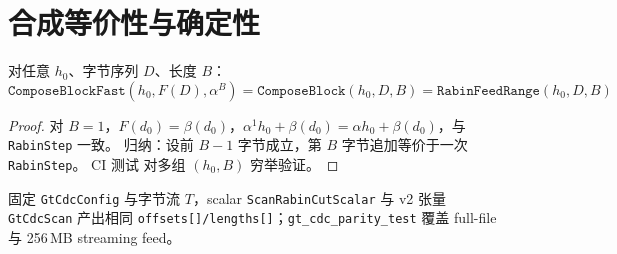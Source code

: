\chapter{合成等价性与确定性}
\label{ch:compose}

\begin{theorem}
对任意 $h_0$、字节序列 $D$、长度 $B$：
\begin{equation}
  \texttt{ComposeBlockFast}(h_0, F(D), \alpha^B)
  = \texttt{ComposeBlock}(h_0, D, B)
  = \texttt{RabinFeedRange}(h_0, D, B)
\end{equation}
\end{theorem}

\begin{proof}
对 $B=1$，$F(d_0)=\beta(d_0)$，$\alpha^1 h_0 + \beta(d_0)=\alpha h_0+\beta(d_0)$，与 \texttt{RabinStep} 一致。
归纳：设前 $B-1$ 字节成立，第 $B$ 字节追加等价于一次 \texttt{RabinStep}。
CI 测试  对多组 $(h_0,B)$ 穷举验证。
\end{proof}

\begin{corollary}[确定性]
固定 \texttt{GtCdcConfig} 与字节流 $T$，scalar \texttt{ScanRabinCutScalar} 与 v2 张量 \texttt{GtCdcScan}
产出相同 \texttt{offsets[]/lengths[]}；\texttt{gt\_cdc\_parity\_test} 覆盖 full-file 与 256\,MB streaming feed。
\end{corollary}

